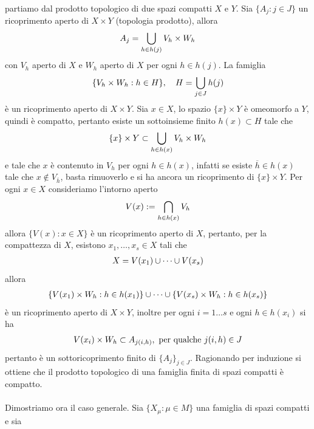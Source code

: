 \documentclass[oneside, 11pt]{amsbook}
\makeatletter
\newcommand{\0}{{(0)}}
\newcommand{\3}{{(3)}}
\theoremstyle{colonplain}
\theoremstyle{colondefinition}
\theoremstyle{colonremark}
\numberwithin{equation}{chapter}
\renewcommand{\proofname}{Dimostrazione}
\renewenvironment{proof}[1][\proofname]{\par
  \pushQED{\qed}%
  \normalfont \topsep6\p@\@plus6\p@\relax
  \trivlist
  \item[\hskip\labelsep\bfseries #1:]\ignorespaces
}{%
  \popQED\endtrivlist\@endpefalse
}
\makeatother
\begin{document}
\begin{proof}
partiamo dal prodotto topologico di due spazi compatti $X$ e $Y$. Sia $\{ A_j : j \in J \}$ un ricoprimento aperto di $X \times Y$ (topologia prodotto), allora
\begin{align}
    A_j = \bigcup_{h \in h(j)} V_h \times W_h \notag
\end{align}
con $V_h$ aperto di $X$ e $W_h$ aperto di $X$ per ogni $h \in h(j)$. La famiglia
\begin{align}
    \{ V_h \times W_h : h \in H \}, \quad H = \bigcup_{j \in J} h(j) \notag
\end{align}
è un ricoprimento aperto di $X \times Y$. Sia $x \in X$, lo spazio $\{ x \} \times Y$ è omeomorfo a $Y$, quindi è compatto, pertanto esiste un sottoinsieme finito $h(x) \subset H$ tale che
\begin{align}
    \{ x \} \times Y \subset \bigcup_{h \in h(x)} V_h \times W_h \notag
\end{align}
e tale che $x$ è contenuto in $V_h$ per ogni $h \in h(x)$, infatti se esiste $\overline{h} \in h(x)$ tale che $x \not\in V_{\overline{h}}$, basta rimuoverlo e si ha ancora un ricoprimento di $\{ x \} \times Y$. Per ogni $x \in X$ consideriamo l'intorno aperto
\begin{align}
    V(x) := \bigcap_{h \in h(x)} V_h \notag
\end{align}
allora $\{ V(x) : x \in X \}$ è un ricoprimento aperto di $X$, pertanto, per la compattezza di $X$, esistono $x_1, \dots, x_s \in X$ tali che
\begin{align}
    X = V(x_1) \cup \dots \cup V(x_s) \notag
\end{align}
allora
\begin{align}
    \{ V(x_1) \times W_h : h \in h(x_1) \} \cup \dots \cup \{ V(x_s) \times W_h : h \in h(x_s) \} \notag
\end{align}
è un ricoprimento aperto di $X \times Y$, inoltre per ogni $i = 1 \dots s$ e ogni $h \in h(x_i)$ si ha
\begin{align}
    V(x_i) \times W_h \subset A_{j(i, h)}, \text{ per qualche } j(i, h) \in J \notag
\end{align}
pertanto è un sottoricoprimento finito di $\{ A_j \}_{j \in J}$. Ragionando per induzione si ottiene che il prodotto topologico di una famiglia finita di spazi compatti è compatto. \\ \\
Dimostriamo ora il caso generale. Sia $\{ X_\mu : \mu \in M \}$ una famiglia di spazi compatti e sia
\begin{align}

\end{align}
\end{proof}
\end{document}
